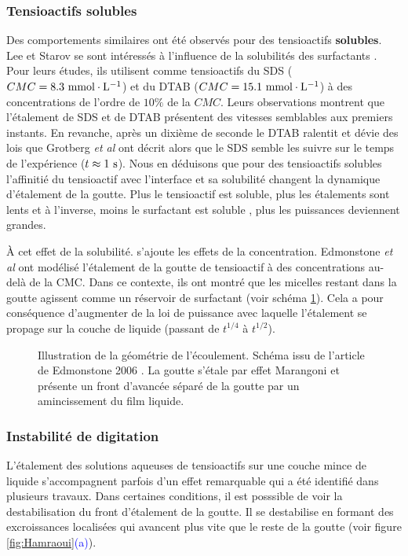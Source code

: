 \subsubsection{Tensioactifs solubles}
Des comportements similaires ont été observés pour des tensioactifs \textbf{solubles}. Lee et Starov se sont intéressés à l'influence de la solubilités des surfactants \cite{Lee2009}. Pour leurs études, ils utilisent comme tensioactifs du SDS ($ CMC = 8.3~\rm mmol\cdot L^{-1}$) et du DTAB ($CMC = 15.1~\rm mmol\cdot L^{-1}$) à des concentrations de l'ordre de $10\%$ de la $CMC$. Leurs observations montrent que l'étalement de SDS et de DTAB présentent des vitesses semblables aux premiers instants. En revanche, après un dixième de seconde le DTAB ralentit et dévie des lois que Grotberg \textit{et al} ont décrit alors que le SDS semble les suivre sur le temps de l'expérience ($t\approx 1~\rm s$). Nous en déduisons que pour des tensioactifs solubles l'affinitié du tensioactif avec l'interface et sa solubilité changent la dynamique d'étalement de la goutte. Plus le tensioactif est soluble, plus les étalements sont lents et à l'inverse, moins le surfactant est soluble , plus les puissances deviennent grandes. 

À cet effet de la solubilité. s'ajoute les effets de la concentration. Edmonstone \textit{et al} \cite{Edmonstone2006} ont modélisé l'étalement de la goutte de tensioactif à des concentrations au-delà de la CMC. Dans ce contexte, ils ont montré que les micelles restant dans la goutte agissent comme un réservoir de surfactant (voir schéma \ref{fig:DropThinFilm}). Cela a pour conséquence d'augmenter de la loi de puissance avec laquelle l'étalement se propage sur la couche de liquide (passant de $t^{1/4}$ à $t^{1/2}$).
\clearpage
\begin{figure}[!ht]
  \centering
  
  \caption{Illustration de la géométrie de l'écoulement. Schéma issu de l'article de Edmonstone 2006 \cite{Edmonstone2006}. La goutte s'étale par effet Marangoni et présente un front d'avancée séparé de la goutte par un amincissement du film liquide.}
  \label{fig:DropThinFilm}
\end{figure}
\subsubsection{Instabilité de digitation}
L'étalement des solutions aqueuses de tensioactifs  sur une couche mince de liquide s'accompagnent parfois d'un effet remarquable qui a été identifié dans plusieurs travaux. Dans certaines conditions, il est posssible de voir la destabilisation du front d'étalement de la goutte. Il se destabilise en formant des excroissances localisées qui avancent plus vite que le reste de la goutte (voir figure \ref{fig:Hamraoui}\textcolor{blue}{(a)}).

